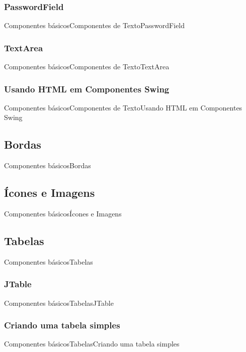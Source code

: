 \documentclass[10pt]{beamer}
\begin{document}
\subsubsection{PasswordField}
\begin{frame}{Componentes básicos}{Componentes de Texto}{PasswordField}
\end{frame}{}
\subsubsection{TextArea}
\begin{frame}{Componentes básicos}{Componentes de Texto}{TextArea}
\end{frame}{}
\subsubsection{Usando HTML em Componentes Swing}
\begin{frame}{Componentes básicos}{Componentes de Texto}{Usando HTML em Componentes Swing}
\end{frame}{}
\subsection{Bordas}
\begin{frame}{Componentes básicos}{Bordas}
\end{frame}{}
\subsection{Ícones e Imagens}
\begin{frame}{Componentes básicos}{Ícones e Imagens}
\end{frame}{}
\subsection{Tabelas}
\begin{frame}{Componentes básicos}{Tabelas}
\end{frame}{}
\subsubsection{JTable}
\begin{frame}{Componentes básicos}{Tabelas}{JTable}
\end{frame}{}
\subsubsection{Criando uma tabela simples}
\begin{frame}{Componentes básicos}{Tabelas}{Criando uma tabela simples}
\end{frame}{}
\end{document}
